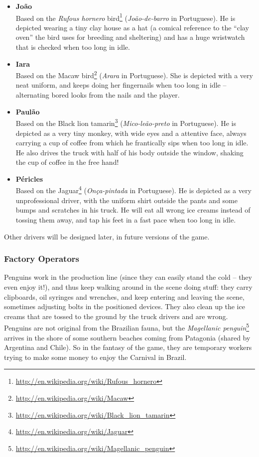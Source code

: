 \documentclass[a4paper]{scrartcl}
\begin{document}
			\begin{itemize}
				\item \textbf{Jo\~ao}\\
				Based on the \textit{Rufous hornero} bird\footnote{\url{http://en.wikipedia.org/wiki/Rufous_hornero}} (\textit{Jo\~ao-de-barro} in Portuguese). He is depicted wearing a tiny clay house as a hat (a comical reference to the ``clay oven'' the bird uses for breeding and sheltering) and has a huge wristwatch that is checked when too long in idle.
				
				\item \textbf{Iara}\\
				Based on the Macaw bird\footnote{\url{http://en.wikipedia.org/wiki/Macaw}} (\textit{Arara} in Portuguese). She is depicted with a very neat uniform, and keeps doing her fingernails when too long in idle -- alternating bored looks from the nails and the player.
				
				\item \textbf{Paul\~ao}\\
				Based on the Black lion tamarin\footnote{\url{http://en.wikipedia.org/wiki/Black_lion_tamarin}} (\textit{Mico-le\~ao-preto} in Portuguese). He is depicted as a very tiny monkey, with wide eyes and a attentive face, always carrying a cup of coffee from which he frantically sips when too long in idle. He also drives the truck with half of his body outside the window, shaking the cup of coffee in the free hand!
				
				\item \textbf{P\'ericles}\\
				Based on the Jaguar\footnote{\url{http://en.wikipedia.org/wiki/Jaguar}} (\textit{On\c{c}a-pintada} in Portuguese). He is depicted as a very unprofessional driver, with the uniform shirt outside the pants and some bumps and scratches in his truck. He will eat all wrong ice creams instead of tossing them away, and tap his feet in a fast pace when too long in idle.
			\end{itemize}
			
			Other drivers will be designed later, in future versions of the game.

		\subsubsection{Factory Operators}
			Penguins work in the production line (since they can easily stand the cold -- they even enjoy it!), and thus keep walking around in the scene doing stuff: they carry clipboards, oil syringes and wrenches, and keep entering and leaving the scene, sometimes adjusting bolts in the positioned devices. They also clean up the ice creams that are tossed to the ground by the truck drivers and are wrong. Penguins are not original from the Brazilian fauna, but the \textit{Magellanic penguin}\footnote{\url{http://en.wikipedia.org/wiki/Magellanic_penguin}} arrives in the shore of some southern beaches coming from Patagonia (shared by Argentina and Chile). So in the fantasy of the game, they are temporary workers trying to make some money to enjoy the Carnival in Brazil.
			
\end{document}
